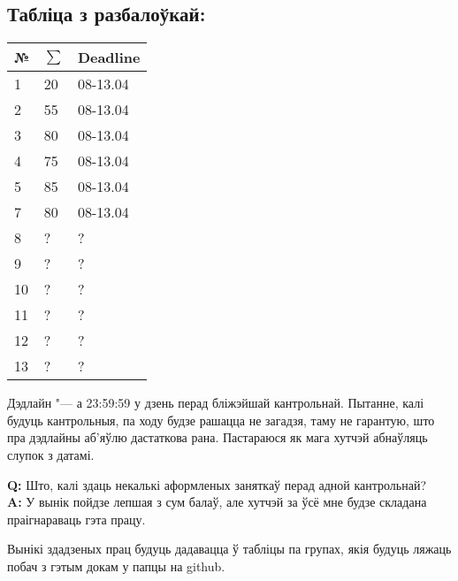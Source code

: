 \documentclass[12pt, a4paper]{extarticle}
\newcommand{\formQA}[2]{%
	\noindent \textbf{Q:} #1 \\
	\textbf{A:} #2
}
\begin{document}
	\subsection{Табліца з разбалоўкай:}
	\begin{table}[H]
		\begin{center}
			\begin{tabular}{|l|l|l|}
				\hline
				\bf №  & $\sum$ & \bf Deadline  \\ \hline
				1    & 20 & 08-13.04\\ \hline
				2   & 55 & 08-13.04 \\ \hline
				3   & 80 & 08-13.04 \\ \hline
				4   & 75 & 08-13.04 \\ \hline
				5   & 85 & 08-13.04 \\ \hline
				7   & 80 & 08-13.04 \\ \hline
				8   & ? & ?  \\ \hline
				9   & ? & ?  \\ \hline
				10   & ? & ?  \\ \hline
				11   & ? & ?  \\ \hline
				12   & ? & ?  \\ \hline
				13   & ? & ?  \\ \hline
			\end{tabular}
		\end{center}
	\end{table}
	Дэдлайн "--- а 23:59:59 у дзень перад бліжэйшай кантрольнай. Пытанне, калі будуць кантрольныя, па ходу будзе рашацца не загадзя, таму не гарантую, што пра дэдлайны аб'яўлю дастаткова рана. Пастараюся як мага хутчэй абнаўляць слупок з датамі.
	
	\formQA{Што, калі здаць некалькі аформленых заняткаў перад адной кантрольнай?}
	{У вынік пойдзе лепшая з сум балаў, але хутчэй за ўсё мне будзе складана праігнараваць гэта працу.}
	
	Вынікі здадзеных прац будуць дадавацца ў табліцы па групах, якія будуць ляжаць побач з гэтым докам у папцы на github.
\end{document}
